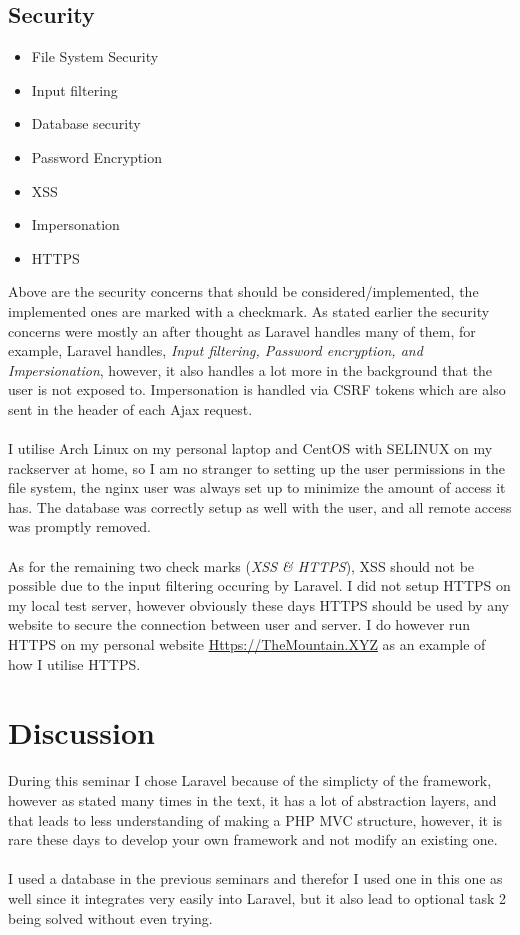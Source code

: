 \documentclass[a4paper]{scrartcl}
\newcommand{\xmark}{\ding{55}}%
\begin{document}
\subsection{Security}
\begin{itemize}
\item{File System Security \checkmark}
\item{Input filtering \checkmark}
\item{Database security \checkmark}
\item{Password Encryption \checkmark}
\item{XSS \checkmark}
\item{Impersonation \checkmark}
\item{HTTPS \xmark}
\end{itemize}
Above are the security concerns that should be considered/implemented,
the implemented ones are marked with a checkmark.
As stated earlier the security concerns were mostly an after thought as Laravel
handles many of them, for example, Laravel handles, \textit{Input filtering,
Password encryption, and Impersionation}, however, it also handles a lot more in
the background that the user is not exposed to. Impersonation is handled via
CSRF tokens which are also sent in the header of each Ajax request.
\\\\
\noindent
I utilise Arch Linux on my personal laptop and CentOS with SELINUX
on my rackserver at home, so I am no stranger to setting up the user permissions
in the file system, the nginx user was always set up to minimize the amount
of access it has. The database was correctly setup as well with the user, and
all remote access was promptly removed.
\\\\
\noindent
As for the remaining two check marks (\textit{XSS \& HTTPS}), XSS should not be
possible due to the input filtering occuring by Laravel.
I did not setup HTTPS on my local test server, however obviously these days HTTPS
should be used by any website to secure the connection between user and server.
I do however run HTTPS on my personal website
\href{Https://themountain.xyz}{Https://TheMountain.XYZ} as an example of how I 
utilise HTTPS.
\section{Discussion}

During this seminar I chose Laravel because of the simplicty of the framework,
however as stated many times in the text, it has a lot of abstraction layers,
and that leads to less understanding of making a PHP MVC structure, however, it
is rare these days to develop your own framework and not modify an existing one.
\\\\
\noindent
I used a database in the previous seminars and therefor I used one in this one as
well since it integrates very easily into Laravel, but it also lead to optional
task 2 being solved without even trying.
\end{document}
